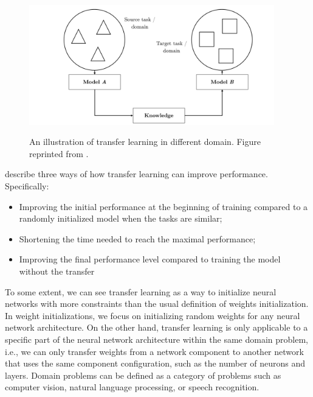 \begin{figure}[h]
    {\includegraphics[width=0.95\textwidth]{img/transfer_learning_scenario.png}}
    \centering
    \caption{An illustration of transfer learning in different domain. Figure reprinted from .}
    \label{img:transfer_learning}
\end{figure}

 describe three ways of how transfer learning can
improve performance. Specifically:
\begin{itemize}
    \item Improving the initial performance at the beginning of training compared
          to a randomly initialized model when the tasks are similar;
    \item Shortening the time needed to reach the maximal performance;
    \item Improving the final performance level compared to training the model
          without the transfer
\end{itemize}

To some extent, we can see transfer learning as a way to initialize neural networks with more constraints than the usual definition of weights initialization. In weight initializations, we focus on initializing random weights for any neural network architecture. On the other hand, transfer learning is only applicable to a specific part of the neural network architecture within the same domain problem, i.e., we can only transfer weights from a network component to another network that uses the same component configuration, such as the number of neurons and layers. Domain problems can be defined as a category of problems such as computer vision, natural language processing, or speech recognition.

